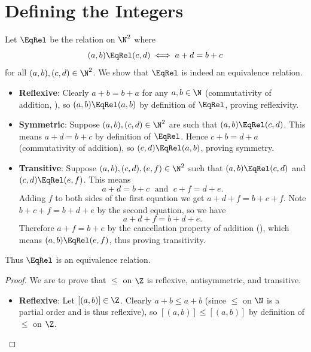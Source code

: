 \section{Defining the Integers}
\begin{questions}
    \item Let $\EqRel$ be the relation on $\N^2$ where
    \[
        (a, b) \EqRel (c, d) \iff a + d = b + c
    \]
    for all $(a, b), (c, d) \in \N^2$. We show that $\EqRel$ is indeed an equivalence relation.
    \begin{itemize}
        \item \textbf{Reflexive}: Clearly $a + b = b + a$ for any $a, b \in \N$ (commutativity of addition, ), so $(a, b) \EqRel (a, b)$ by definition of $\EqRel$, proving reflexivity.
        
        \item \textbf{Symmetric}: Suppose $(a, b), (c, d) \in \N^2$ are such that $(a, b) \EqRel (c, d)$. This means $a + d = b + c$ by definition of $\EqRel$. Hence $c + b = d + a$ (commutativity of addition), so $(c, d) \EqRel (a, b)$, proving symmetry.
        
        \item \textbf{Transitive}: Suppose $(a, b), (c, d), (e, f) \in \N^2$ such that $(a, b) \EqRel (c, d)$ and $(c, d) \EqRel (e, f)$. This means
        \[
            a + d = b + c \;\text{ and }\; c + f = d + e.
        \]
        Adding $f$ to both sides of the first equation we get $a + d + f = b + c + f$. Note $b + c + f = b + d + e$ by the second equation, so we have
        \[
            a + d + f = b + d + e.
        \]
        Therefore $a + f = b + e$ by the cancellation property of addition (), which means $(a, b) \EqRel (e, f)$, thus proving transitivity.
    \end{itemize}
    Thus $\EqRel$ is an equivalence relation.

    \item \begin{partquestions}{\alph*}
        \item \begin{proof}
            We are to prove that $\leq$ on $\Z$ is reflexive, antisymmetric, and transitive.
            \begin{itemize}
                \item \textbf{Reflexive}: Let $[(a,b)] \in \Z$. Clearly $a+b \leq a+b$ (since $\leq$ on $\N$ is a partial order and is thus reflexive), so $[(a,b)] \leq [(a,b)]$ by definition of $\leq$ on $\Z$.
                

\end{itemize}
\end{proof}
\end{partquestions}
\end{questions}
